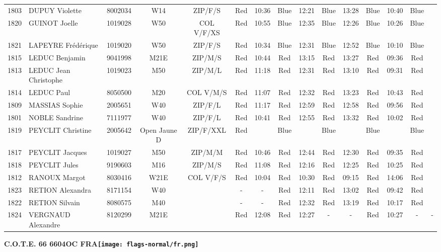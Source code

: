 \documentclass{report}
\begin{document}
\begin{longtable}{|c|l|r|c|c|*{5}{cc|}}
    1803 & DUPUY Violette & 8002034 & W14 & ZIP/F/S & Red & 10:36 & Blue & 12:21 & Blue & 13:28 & Blue & 10:40 & Blue &  \\
    1820 & GUINOT Joelle & 1019028 & W50 & COL V/F/XS & Red & 10:55 & Blue & 12:35 & Blue & 12:26 & Blue & 10:26 & Blue &  \\
    1821 & LAPEYRE Frédérique & 1019020 & W50 & ZIP/F/S & Red & 10:34 & Blue & 12:31 & Blue & 12:52 & Blue & 10:10 & Blue &  \\
    1815 & LEDUC Benjamin & 9041998 & M21E & ZIP/M/S & Red & 10:44 & Red & 13:15 & Red & 13:27 & Red & 09:36 & Red &  \\
    1813 & LEDUC Jean Christophe & 1019023 & M50 & ZIP/M/L & Red & 11:18 & Red & 12:31 & Red & 13:10 & Red & 09:31 & Red &  \\
    1814 & LEDUC Paul & 8050500 & M20 & COL V/M/S & Red & 11:07 & Red & 12:32 & Red & 13:23 & Red & 10:43 & Red &  \\
    1809 & MASSIAS Sophie & 2005651 & W40 & ZIP/F/L & Red & 11:17 & Red & 12:59 & Red & 12:58 & Red & 09:56 & Red &  \\
    1801 & NOBLE Sandrine & 7111977 & W40 & ZIP/F/L & Red & 10:41 & Red & 12:55 & Red & 13:32 & Red & 10:02 & Red &  \\
    1819 & PEYCLIT Christine & 2005642 & Open Jaune D & ZIP/F/XXL & Red &   & Blue &   & Blue &   & Blue &   & Blue &  \\
    1817 & PEYCLIT Jacques & 1019027 & M50 & ZIP/M/M & Red & 10:46 & Red & 12:44 & Red & 12:30 & Red & 09:35 & Red &  \\
    1818 & PEYCLIT Jules & 9190603 & M16 & ZIP/M/S & Red & 11:08 & Red & 12:16 & Red & 12:25 & Red & 10:25 & Red &  \\
    1812 & RANOUX Margot & 8030416 & W21E & COL V/F/S & Red & 10:04 & Red & 10:30 & Red & 09:15 & Red & 14:06 & Red &  \\
    1823 & RETION Alexandra & 8171154 & W40 &   & - &  - & Red & 12:11 & Red & 13:02 & Red & 09:42 & Red &  \\
    1822 & RETION Silvain & 8080575 & M40 &   & - &  - & Red & 12:32 & Red & 13:19 & Red & 10:17 & Red &  \\
    1824 & VERGNAUD Alexandre & 8120299 & M21E &   & Red & 12:08 & Red & 12:27 & - &  - & Red & 10:27 & - &  -\\
  \end{longtable}
\newpage
  \Huge \centering \bfseries C.O.T.E. 66 6604OC FRA\normalfont \footnotesize \sffamily \hfill \texttt{[image: flags-normal/fr.png]} \newline 
\end{document}
